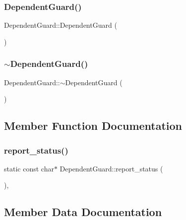 \subsubsection{\texorpdfstring{DependentGuard()}{DependentGuard()}}
{\footnotesize\ttfamily Dependent\+Guard\+::\+Dependent\+Guard (\begin{DoxyParamCaption}{ }\end{DoxyParamCaption})\hspace{0.3cm}{\ttfamily [inline]}}

\mbox{\label{struct_dependent_guard_a44db8266cbc624255e05bed92b9d1c2c}} 
\subsubsection{\texorpdfstring{$\sim$DependentGuard()}{~DependentGuard()}}
{\footnotesize\ttfamily Dependent\+Guard\+::$\sim$\+Dependent\+Guard (\begin{DoxyParamCaption}{ }\end{DoxyParamCaption})\hspace{0.3cm}{\ttfamily [inline]}}



\subsection{Member Function Documentation}
\mbox{\label{struct_dependent_guard_a891c08bb77af85b9772c75cc67d5487a}} 
\subsubsection{\texorpdfstring{report\_status()}{report\_status()}}
{\footnotesize\ttfamily static const char$\ast$ Dependent\+Guard\+::report\+\_\+status (\begin{DoxyParamCaption}{ }\end{DoxyParamCaption})\hspace{0.3cm}{\ttfamily [inline]}, {\ttfamily [static]}}



\subsection{Member Data Documentation}
\mbox{\label{struct_dependent_guard_a23268fb89a00928e483fbca9a04cb3d5}} 
